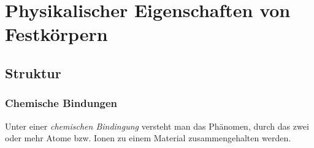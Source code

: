 \documentclass{article}
\begin{document}
\newpage


\section{Physikalischer Eigenschaften von Festkörpern}
\subsection{Struktur}
\subsubsection{Chemische Bindungen}
Unter einer \textit{chemischen Bindingung} versteht man das Phänomen, durch das zwei oder mehr Atome bzw. Ionen zu einem Material zusammengehalten werden.\\
\\
\end{document}
